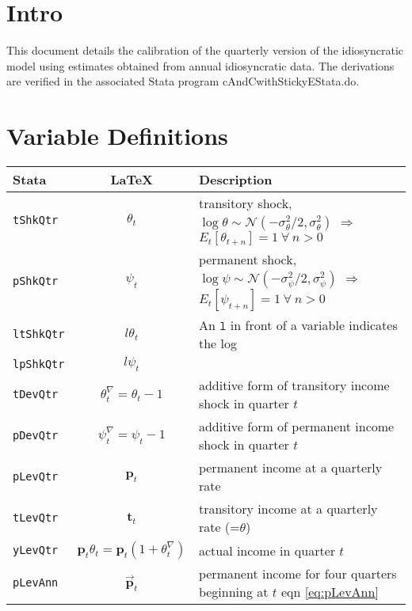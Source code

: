 \documentclass[11pt,letterpaper]{article}
\begin{document}
\tableofcontents 

\section{Intro}
This document details the calibration of the quarterly version of the idiosyncratic
model using estimates obtained from annual idiosyncratic data.  The derivations are
verified in the associated Stata program cAndCwithStickyE{Stata}.do.

\section{Variable Definitions}

\begin{center}
\begin{tabular}{lcl}
Stata              & LaTeX                       & Description
\\ \hline
    \texttt{tShkQtr}  & $\theta_{t}$                     & transitory shock, $\log \theta\sim\mathcal{N}(-\sigma^{2}_{\theta}/2,\sigma^{2}_{\theta})$ $\Rightarrow$ $E_{t}[\theta_{t+n}]=1~\forall~n>0$
\\  \texttt{pShkQtr}  & $\psi_{t}$                     & permanent shock, $\log \psi\sim\mathcal{N}(-\sigma^{2}_{\psi}/2,\sigma^{2}_{\psi})$ $\Rightarrow$ $E_{t}[\psi_{t+n}]=1~\forall~n>0$
\\  \texttt{ltShkQtr}  & $l{\theta}_{t}$              & An $\texttt{l}$ in front of a variable indicates the log
\\  \texttt{lpShkQtr}  & $l{\psi}_{t}$                     & 
\\  \texttt{tDevQtr}  & $\theta^{\nabla}_{t}=\theta_{t}-1$    & additive form of transitory income shock in quarter $t$ %
\\  \texttt{pDevQtr}  & $\psi^{\nabla}_{t}=\psi_{t}-1$    & additive form of permanent income shock in quarter $t$ %
\\  \texttt{pLevQtr}  & $\mathbf{p}_{t}$                 & permanent income at a quarterly rate
\\  \texttt{tLevQtr}  & $\mathbf{t}_{t}$                 & transitory income at a quarterly rate (=$\theta$)
\\  \texttt{yLevQtr}  & $\mathbf{p}_{t}\theta_{t}=\mathbf{p}_{t}(1+\theta^{\nabla}_{t})$   & actual income in quarter $t$
\\  \texttt{pLevAnn}  & $\vec{\mathbf{p}}_{t}$                & permanent income for four quarters beginning at $t$ eqn \eqref{eq:pLevAnn}

\end{tabular}
\end{center}
\end{document}
